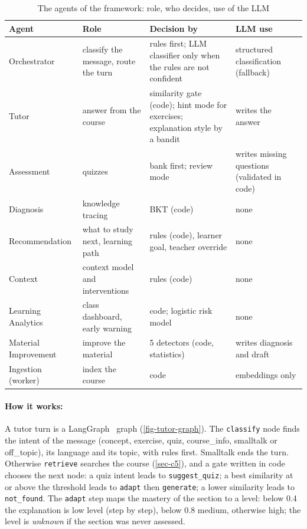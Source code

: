 \begin{table}[htbp]
\centering
\caption{The agents of the framework: role, who decides, use of the LLM}
\label{tab-agents-roster}
\scriptsize
\begin{tabularx}{\textwidth}{@{}L{2.4cm}YL{3.3cm}L{2.6cm}@{}}
\toprule
\textbf{Agent} & \textbf{Role} & \textbf{Decision by} & \textbf{LLM use} \\
\midrule
Orchestrator & classify the message, route the turn & rules first; LLM classifier only when the rules are not confident & structured classification (fallback) \\
Tutor & answer from the course & similarity gate (code); hint mode for exercises; explanation style by a bandit & writes the answer \\
Assessment & quizzes & bank first; review mode & writes missing questions (validated in code) \\
Diagnosis & knowledge tracing & BKT (code) & none \\
Recommendation & what to study next, learning path & rules (code), learner goal, teacher override & none \\
Context & context model and interventions & rules (code) & none \\
Learning Analytics & class dashboard, early warning & code; logistic risk model & none \\
Material Improvement & improve the material & 5 detectors (code, statistics) & writes diagnosis and draft \\
Ingestion (worker) & index the course & code & embeddings only \\
\bottomrule
\end{tabularx}
\end{table}

\paragraph{How it works:} A tutor turn is a LangGraph~\cite{langgraph_docs}
graph (\cref{fig-tutor-graph}). The \texttt{classify} node finds the intent
of the message (concept, exercise, quiz, course\_info, smalltalk or
off\_topic), its language and its topic, with rules first. Smalltalk ends
the turn. Otherwise \texttt{retrieve} searches the course
(\cref{sec-c5}), and a gate written in code chooses the next node: a quiz
intent leads to \texttt{suggest\_quiz}; a best similarity at or above the
threshold leads to \texttt{adapt} then \texttt{generate}; a lower
similarity leads to \texttt{not\_found}. The \texttt{adapt} step maps the
mastery of the section to a level: below 0.4 the explanation is low level
(step by step), below 0.8 medium, otherwise high; the level is
\emph{unknown} if the section was never assessed.

